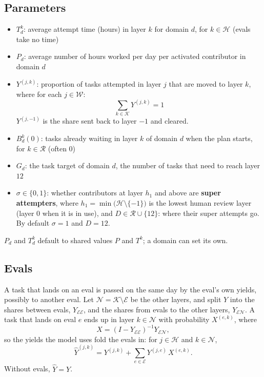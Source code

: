 \documentclass{article}
\begin{document}
\subsection*{Parameters}
\begin{itemize}
  \item $T^k_d$: average attempt time (hours) in layer $k$ for domain $d$, for $k \in \mathcal{H}$ (evals take no time)

  \item $P_d$: average number of hours worked per day per activated contributor in domain $d$

  \item $Y^{(j,k)}$: proportion of tasks attempted in layer $j$ that are moved to layer $k$, where for each $j \in \mathcal{W}$:
  \[
    \sum_{k \in \mathcal{K}} Y^{(j,k)} = 1
  \]
  $Y^{(j,-1)}$ is the share sent back to layer $-1$ and cleared.

  \item $B^k_d(0)$: tasks already waiting in layer $k$ of domain $d$ when the plan starts, for $k \in \mathcal{R}$ (often 0)

  \item $G_d$: the task target of domain $d$, the number of tasks that need to reach layer $12$

  \item $\sigma \in \{0, 1\}$: whether contributors at layer $h_1$ and above are \textbf{super attempters}, where $h_1 = \min\bigl(\mathcal{H} \setminus \{-1\}\bigr)$ is the lowest human review layer (layer $0$ when it is in use), and $D \in \mathcal{R} \cup \{12\}$: where their super attempts go. By default $\sigma = 1$ and $D = 12$.
\end{itemize}
$P_d$ and $T^k_d$ default to shared values $P$ and $T^k$; a domain can set its own.

\subsection*{Evals}
A task that lands on an eval is passed on the same day by the eval's own yields, possibly to another eval. Let $\mathcal{N} = \mathcal{K} \setminus \mathcal{E}$ be the other layers, and split $Y$ into the shares between evals, $Y_{\mathcal{E}\mathcal{E}}$, and the shares from evals to the other layers, $Y_{\mathcal{E}\mathcal{N}}$. A task that lands on eval $e$ ends up in layer $k \in \mathcal{N}$ with probability $X^{(e,k)}$, where
\[
  X = \left(I - Y_{\mathcal{E}\mathcal{E}}\right)^{-1} Y_{\mathcal{E}\mathcal{N}},
\]
so the yields the model uses fold the evals in: for $j \in \mathcal{H}$ and $k \in \mathcal{N}$,
\[
  \hat{Y}^{(j,k)} = Y^{(j,k)} + \sum_{e \in \mathcal{E}} Y^{(j,e)}\, X^{(e,k)}.
\]
Without evals, $\hat{Y} = Y$.
\end{document}
